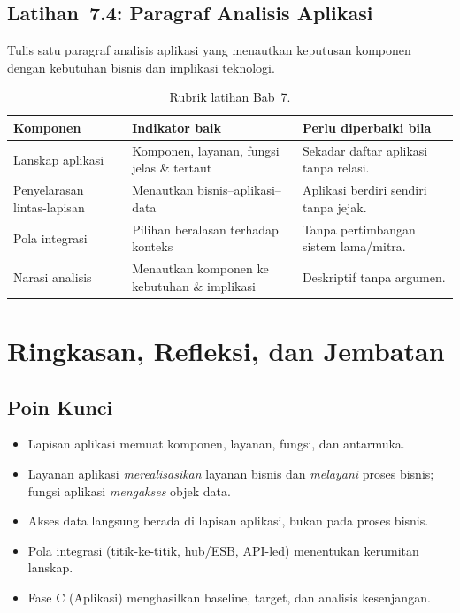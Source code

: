 \subsection*{Latihan~7.4: Paragraf Analisis Aplikasi}
Tulis satu paragraf analisis aplikasi yang menautkan keputusan komponen dengan
kebutuhan bisnis dan implikasi teknologi.

\begin{table}[htbp]
\centering
\scriptsize
\caption{Rubrik latihan Bab~7.}
\label{tab:rubrik-bab6-app}
\begin{tabularx}{\textwidth}{@{}p{} X X@{}}
\hline
\textbf{Komponen} & \textbf{Indikator baik} & \textbf{Perlu diperbaiki bila} \\
\hline
Lanskap aplikasi & Komponen, layanan, fungsi jelas \& tertaut & Sekadar daftar
aplikasi tanpa relasi. \\
Penyelarasan lintas-lapisan & Menautkan bisnis--aplikasi--data & Aplikasi berdiri
sendiri tanpa jejak. \\
Pola integrasi & Pilihan beralasan terhadap konteks & Tanpa pertimbangan sistem
lama/mitra. \\
Narasi analisis & Menautkan komponen ke kebutuhan \& implikasi & Deskriptif
tanpa argumen. \\
\hline
\end{tabularx}
\end{table}

\section{Ringkasan, Refleksi, dan Jembatan}

\subsection*{Poin Kunci}
\begin{itemize}
  \item Lapisan aplikasi memuat komponen, layanan, fungsi, dan antarmuka.
  \item Layanan aplikasi \emph{merealisasikan} layanan bisnis dan \emph{melayani}
        proses bisnis; fungsi aplikasi \emph{mengakses} objek data.
  \item Akses data langsung berada di lapisan aplikasi, bukan pada proses bisnis.
  \item Pola integrasi (titik-ke-titik, hub/ESB, API-led) menentukan kerumitan
        lanskap.
  \item Fase C (Aplikasi) menghasilkan baseline, target, dan analisis kesenjangan.
\end{itemize}

